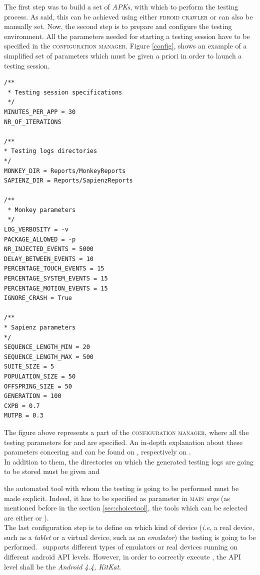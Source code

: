 The first step was to build a set of \textit{APKs}, with which to perform the testing process. As said, this can be achieved using either \textsc{fdroid crawler} or can also be manually set. Now, the second step is to prepare and configure the testing environment. 
All the parameters needed for starting a testing session have to be specified in the \textsc{configuration manager}. Figure \ref{config}, shows an example of a simplified set of parameters which must be given a priori in order to launch a testing session. \newpage
\label{config}
\begin{lstlisting}[caption=A set of needed properties which get elaborated during the testing session]
/**
 * Testing session specifications
 */
MINUTES_PER_APP = 30
NR_OF_ITERATIONS
 
/**
* Testing logs directories
*/
MONKEY_DIR = Reports/MonkeyReports
SAPIENZ_DIR = Reports/SapienzReports

/**
 * Monkey parameters
 */
LOG_VERBOSITY = -v 
PACKAGE_ALLOWED = -p
NR_INJECTED_EVENTS = 5000
DELAY_BETWEEN_EVENTS = 10
PERCENTAGE_TOUCH_EVENTS = 15
PERCENTAGE_SYSTEM_EVENTS = 15
PERCENTAGE_MOTION_EVENTS = 15
IGNORE_CRASH = True

/**
* Sapienz parameters
*/
SEQUENCE_LENGTH_MIN = 20
SEQUENCE_LENGTH_MAX = 500
SUITE_SIZE = 5
POPULATION_SIZE = 50
OFFSPRING_SIZE = 50
GENERATION = 100
CXPB = 0.7
MUTPB = 0.3
\end{lstlisting}
The figure above represents a part of the \textsc{configuration manager}, where all the testing parameters for \monkey and \sapienz are specified. An in-depth explanation about these parameters concering \monkey and \sapienz can be found on \cite{monkey}, respectively on \cite{sapienz}.\\
In addition to them, the directories on which the generated testing logs are going to be stored must be given and


the automated tool with whom the testing is going to be performed must be made explicit. Indeed, it has to be specified as parameter in \textsc{main} \textit{args} (as mentioned before in the section \ref{sec:choicetool}, the tools which can be selected are either \monkey or \sapienz). \\
The last configuration step is to define on which kind of device (\textit{i.e}, a real device, such as a \textit{tablet} or a virtual device, such as an \textit{emulator}) the testing is going to be performed. \toolname\ supports different types of emulators or real devices running on different android API levels. However, in order to correctly execute \sapienz, the API level shall be the \textit{Android 4.4, KitKat}. 


